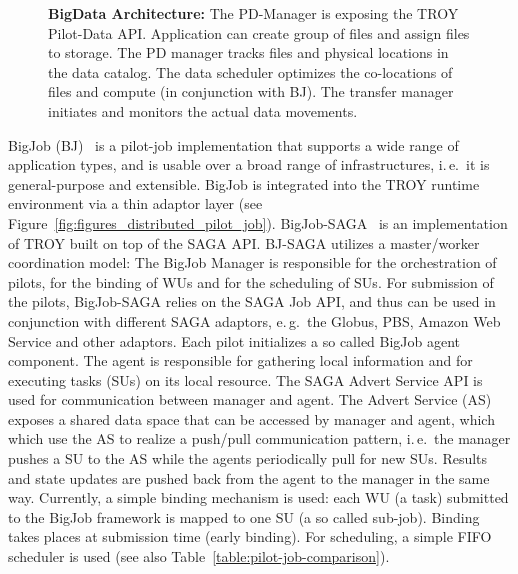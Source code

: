 \documentclass[conference,final]{IEEEtran}
\newcommand{\upp}{\vspace*{-0.5em}}
\begin{document}
\begin{figure}[t]
\begin{minipage}[b]{0.475\linewidth}
    \caption{\textbf{BigData Architecture:} The PD-Manager is exposing the
      TROY Pilot-Data API. Application can create group of files and assign 
      files to storage. The PD manager tracks files and physical locations in
      the data catalog. The data scheduler optimizes the co-locations
      of files and compute (in conjunction with BJ). The transfer
      manager initiates and monitors the actual data
      movements. \upp\upp}
	\label{fig:pilot-data-architecture}
	\end{minipage}
\end{figure}



BigJob (BJ)~\cite{bigjob_web} is a pilot-job implementation that supports a wide
range of application types, and is usable over a broad range of infrastructures,
i.\,e.\ it is general-purpose and extensible. BigJob is integrated into the TROY
runtime environment via a thin adaptor layer (see
Figure~\ref{fig:figures_distributed_pilot_job}).
BigJob-SAGA~\cite{saga_bigjob_condor_cloud} is an implementation of TROY built on
top of the SAGA API. BJ-SAGA utilizes a master/worker coordination model: The
BigJob Manager is responsible for the orchestration of pilots, for the binding 
of WUs and for the scheduling of SUs. For submission of the pilots, BigJob-SAGA
relies on the SAGA Job API, and thus can be used in conjunction with different
SAGA adaptors, e.\,g.\ the Globus, PBS, Amazon Web Service and other adaptors.
Each pilot initializes a so called BigJob agent component. The agent is
responsible for gathering local information and for executing tasks (SUs) on its
local resource. The SAGA Advert Service API is used for communication
between manager and agent. The Advert Service (AS) exposes a shared data space that
can be accessed by manager and agent, which which use the AS to
realize a push/pull communication
pattern, i.\,e.\ the manager pushes a SU to the AS while the agents
periodically pull for new SUs. Results and state updates are pushed back from
the agent to the manager in the same way. Currently, a simple binding mechanism
is used: each WU (a task) submitted to the BigJob framework is mapped to one SU
(a so called sub-job). Binding takes places at submission time (early binding). For
scheduling, a simple FIFO scheduler is used (see also
Table~\ref{table:pilot-job-comparison}).
\end{document}
